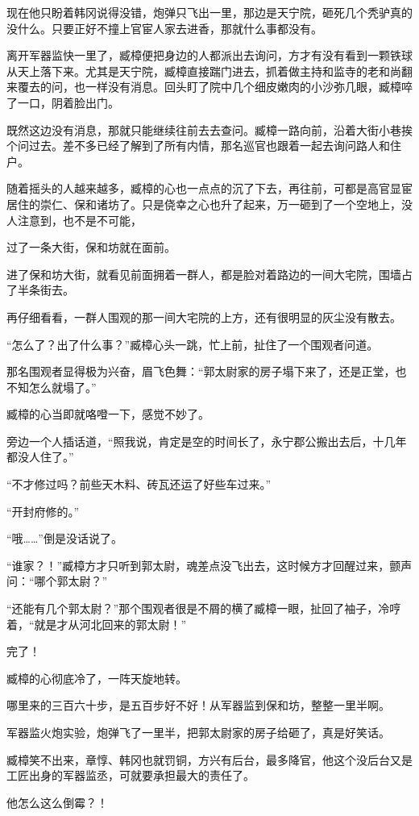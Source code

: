 现在他只盼着韩冈说得没错，炮弹只飞出一里，那边是天宁院，砸死几个秃驴真的没什么。只要正好不撞上官宦人家去进香，那就什么事都没有。

离开军器监快一里了，臧樟便把身边的人都派出去询问，方才有没有看到一颗铁球从天上落下来。尤其是天宁院，臧樟直接踹门进去，抓着做主持和监寺的老和尚翻来覆去的问，也一样没有消息。回头盯了院中几个细皮嫩肉的小沙弥几眼，臧樟啐了一口，阴着脸出门。

既然这边没有消息，那就只能继续往前去去查问。臧樟一路向前，沿着大街小巷挨个问过去。差不多已经了解到了所有内情，那名巡官也跟着一起去询问路人和住户。

随着摇头的人越来越多，臧樟的心也一点点的沉了下去，再往前，可都是高官显宦居住的崇仁、保和诸坊了。只是侥幸之心也升了起来，万一砸到了一个空地上，没人注意到，也不是不可能，

过了一条大街，保和坊就在面前。

进了保和坊大街，就看见前面拥着一群人，都是脸对着路边的一间大宅院，围墙占了半条街去。

再仔细看看，一群人围观的那一间大宅院的上方，还有很明显的灰尘没有散去。

“怎么了？出了什么事？”臧樟心头一跳，忙上前，扯住了一个围观者问道。

那名围观者显得极为兴奋，眉飞色舞：“郭太尉家的房子塌下来了，还是正堂，也不知怎么就塌了。”

臧樟的心当即就咯噔一下，感觉不妙了。

旁边一个人插话道，“照我说，肯定是空的时间长了，永宁郡公搬出去后，十几年都没人住了。”

“不才修过吗？前些天木料、砖瓦还运了好些车过来。”

“开封府修的。”

“哦……”倒是没话说了。

“谁家？！”臧樟方才只听到郭太尉，魂差点没飞出去，这时候方才回醒过来，颤声问：“哪个郭太尉？”

“还能有几个郭太尉？”那个围观者很是不屑的横了臧樟一眼，扯回了袖子，冷哼着，“就是才从河北回来的郭太尉！”

完了！

臧樟的心彻底冷了，一阵天旋地转。

哪里来的三百六十步，是五百步好不好！从军器监到保和坊，整整一里半啊。

军器监火炮实验，炮弹飞了一里半，把郭太尉家的房子给砸了，真是好笑话。

臧樟笑不出来，章惇、韩冈也就罚铜，方兴有后台，最多降官，他这个没后台又是工匠出身的军器监丞，可就要承担最大的责任了。

他怎么这么倒霉？！

